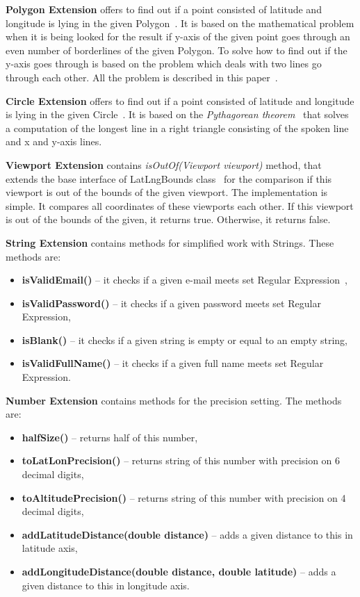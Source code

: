 \textbf{Polygon Extension} offers to find out if a point consisted of latitude and longitude is lying in the given Polygon~\cite{googleMapsPolygon}.
It is based on the mathematical problem when it is being looked for the result if y-axis of the given point goes through an even number of borderlines of the given Polygon.
To solve how to find out if the y-axis goes through is based on the problem which deals with two lines go through each other.
All the problem is described in this paper~\cite{geometricAlgorithms}.

\textbf{Circle Extension} offers to find out if a point consisted of latitude and longitude is lying in the given Circle~\cite{googleMapsCircles}.
It is based on the \textit{Pythagorean theorem}~\cite{pythagoreanTheorem} that solves a computation of the longest line in a right triangle consisting of the spoken line and x and y-axis lines.

\textbf{Viewport Extension} contains \textit{isOutOf(Viewport viewport)} method, that extends the base interface of LatLngBounds class~\cite{latLngBounds} for the comparison if this viewport is out of the bounds of the given viewport.
The implementation is simple.
It compares all coordinates of these viewports each other.
If this viewport is out of the bounds of the given, it returns true.
Otherwise, it returns false.

\textbf{String Extension} contains methods for simplified work with Strings.
These methods are:
\begin{itemize}
    \item \textbf{isValidEmail()} -- it checks if a given e-mail meets set Regular Expression~\cite{regExp},
    \item \textbf{isValidPassword()} -- it checks if a given password meets set Regular Expression,
    \item \textbf{isBlank()} -- it checks if a given string is empty or equal to an empty string,
    \item \textbf{isValidFullName()} -- it checks if a given full name meets set Regular Expression.
\end{itemize}

\textbf{Number Extension} contains methods for the precision setting.
The methods are:
\begin{itemize}
    \item \textbf{halfSize()} -- returns half of this number,
    \item \textbf{toLatLonPrecision()} -- returns string of this number with precision on 6 decimal digits,
    \item \textbf{toAltitudePrecision()} -- returns string of this number with precision on 4 decimal digits,
    \item \textbf{addLatitudeDistance(double distance)} -- adds a given distance to this in latitude axis,
    \item \textbf{addLongitudeDistance(double distance, double latitude)} -- adds a given distance to this in longitude axis.
\end{itemize}

